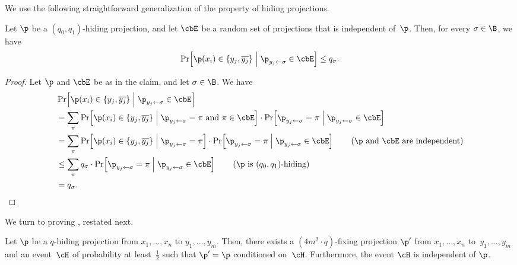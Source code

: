 We use the following straightforward generalization of the property
of hiding projections. 
\begin{claim}
\label{claim:generalized-hiding}Let $\p$ be a $(q_{0},q_{1})$-hiding
projection, and let $\cbE$ be a random set of projections that is
independent of~$\p$. Then, for every $\sigma\in\B$, we have
\[
\Pr\!\left[\p(x_{i})\in\left\{ y_{j},\overline{y_{j}}\right\} \;\middle|\;\p_{y_{j}\gets\sigma}\in\cbE\right]\le q_{\sigma}.
\]
\end{claim}
%
\begin{proof}
Let $\p$ and $\cbE$ be as in the claim, and let $\sigma\in\B$.
We have 
\begin{align*}
 & \Pr\!\left[\p(x_{i})\in\left\{ y_{j},\overline{y_{j}}\right\} \;\middle|\;\p_{y_{j}\gets\sigma}\in\cbE\right]\\
 & =\sum_{\pi}\Pr\!\left[\p(x_{i})\in\left\{ y_{j},\overline{y_{j}}\right\} \;\middle|\;\p_{y_{j}\gets\sigma}=\pi\text{~and~}\pi\in\cbE\right]\cdot\Pr\!\left[\p_{y_{j}\gets\sigma}=\pi\;\middle|\;\p_{y_{j}\gets\sigma}\in\cbE\right]\\
 & =\sum_{\pi}\Pr\!\left[\p(x_{i})\in\left\{ y_{j},\overline{y_{j}}\right\} \;\middle|\;\p_{y_{j}\gets\sigma}=\pi\right]\cdot\Pr\!\left[\p_{y_{j}\gets\sigma}=\pi\;\middle|\;\p_{y_{j}\gets\sigma}\in\cbE\right]\tag{\ensuremath{\p} and \ensuremath{\cbE} are independent}\\
 & \le\sum_{\pi}q_{\sigma}\cdot\Pr\!\left[\p_{y_{j}\gets\sigma}=\pi\;\middle|\;\p_{y_{j}\gets\sigma}\in\cbE\right]\tag{\ensuremath{\p} is \ensuremath{(q_{0},q_{1})}-hiding}\\
 & =q_{\sigma}.\qedhere
\end{align*}
\end{proof}

We turn to proving ,
restated next.
\begin{restated}{}
Let $\p$ be a $q$-hiding projection from $x_{1},\ldots,x_{n}$
to $y_{1},\ldots,y_{m}$. Then, there exists a $(4m^{2}\cdot q)$-fixing
projection $\p'$ from $x_{1},\ldots,x_{n}$ to~$y_{1},\ldots,y_{m}$
and an event~$\cH$ of probability at least~$\frac{1}{2}$ such
that $\p'=\p$ conditioned on~$\cH$. Furthermore, the event $\cH$
is independent of $\p$.
\end{restated}

